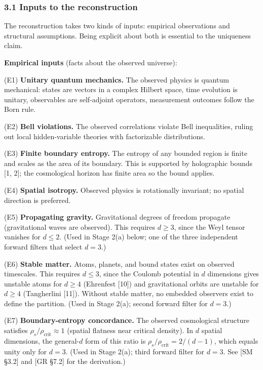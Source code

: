 \documentclass[
]{article}
\begin{document}
\hypertarget{inputs-to-the-reconstruction}{%
\subsubsection{3.1 Inputs to the
reconstruction}\label{inputs-to-the-reconstruction}}

The reconstruction takes two kinds of inputs: empirical observations and
structural assumptions. Being explicit about both is essential to the
uniqueness claim.

\textbf{Empirical inputs} (facts about the observed universe):

(E1) \textbf{Unitary quantum mechanics.} The observed physics is quantum
mechanical: states are vectors in a complex Hilbert space, time
evolution is unitary, observables are self-adjoint operators,
measurement outcomes follow the Born rule.

(E2) \textbf{Bell violations.} The observed correlations violate Bell
inequalities, ruling out local hidden-variable theories with
factorizable distributions.

(E3) \textbf{Finite boundary entropy.} The entropy of any bounded region
is finite and scales as the area of its boundary. This is supported by
holographic bounds {[}1, 2{]}; the cosmological horizon has finite area
so the bound applies.

(E4) \textbf{Spatial isotropy.} Observed physics is rotationally
invariant; no spatial direction is preferred.

(E5) \textbf{Propagating gravity.} Gravitational degrees of freedom
propagate (gravitational waves are observed). This requires
\(d \geq 3\), since the Weyl tensor vanishes for \(d \leq 2\). (Used in
Stage 2(a) below; one of the three independent forward filters that
select \(d = 3\).)

(E6) \textbf{Stable matter.} Atoms, planets, and bound states exist on
observed timescales. This requires \(d \leq 3\), since the Coulomb
potential in \(d\) dimensions gives unstable atoms for \(d \geq 4\)
(Ehrenfest {[}10{]}) and gravitational orbits are unstable for
\(d \geq 4\) (Tangherlini {[}11{]}). Without stable matter, no embedded
observers exist to define the partition. (Used in Stage 2(a); second
forward filter for \(d = 3\).)

(E7) \textbf{Boundary-entropy concordance.} The observed cosmological
structure satisfies \(\rho_s / \rho_{\text{crit}} \approx 1\) (spatial
flatness near critical density). In \(d\) spatial dimensions, the
general-\(d\) form of this ratio is
\(\rho_s / \rho_{\text{crit}} = 2/(d-1)\), which equals unity only for
\(d = 3\). (Used in Stage 2(a); third forward filter for \(d = 3\). See
{[}SM §3.2{]} and {[}GR §7.2{]} for the derivation.)
\end{document}
